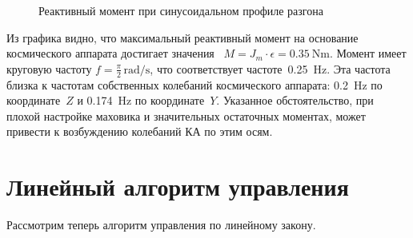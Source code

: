 \begin{figure}[ht]
	\caption{Реактивный момент при синусоидальном профиле разгона}
	\label{fig:sin_moment}
\end{figure}

Из графика видно, что максимальный реактивный момент на основание космического аппарата достигает значения~ $M = J_m \cdot \epsilon = \SI{0.35}{\newton\metre}.$ Момент имеет круговую частоту $f = \frac{\pi}{2}\, \si{\radian/\second}$, что соответствует частоте~\SI{0.25}{\hertz}. Эта частота близка к частотам собственных колебаний космического аппарата: \SI{0.2}{\hertz} по координате~$Z$ и \SI{0.174}{\hertz} по координате~$Y$. Указанное обстоятельство, при плохой настройке маховика и значительных остаточных моментах, может привести к возбуждению колебаний КА по этим осям.

\section{Линейный алгоритм управления}\label{sec:ch2/sec2}

Рассмотрим теперь алгоритм управления по линейному закону.

